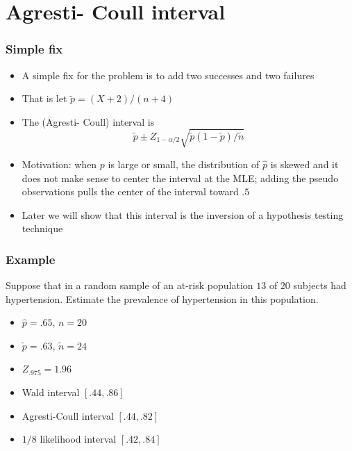 \documentclass[aspectratio=169]{beamer}
\begin{document}
\section{Agresti- Coull interval}
\begin{frame}\frametitle{Simple fix}
\begin{itemize}
\item A simple fix for the problem is to add two successes and two failures
\item That is let $\tilde p = (X + 2) / (n + 4)$
\item The (Agresti- Coull) interval is 
  $$
  \tilde p \pm Z_{1-\alpha/2} \sqrt{\tilde p (1 - \tilde p) / \tilde n}
  $$
\item Motivation: when $p$ is large or small, the distribution of
  $\hat p$ is skewed and it does not make sense to center the interval
  at the MLE; adding the pseudo observations pulls the center of
  the interval toward $.5$
\item Later we will show that this interval is the inversion of a
  hypothesis testing technique
\end{itemize}
\end{frame}

\begin{frame}\frametitle{Example}
Suppose that in a random sample of an at-risk population
$13$ of $20$ subjects had hypertension. Estimate the prevalence
of hypertension in this population.
\begin{itemize}
\item $\hat p = .65$,  $n = 20$
\item $\tilde p = .63$, $\tilde n = 24$
\item $Z_{.975} = 1.96$
\item Wald interval $[.44, .86]$
\item Agresti-Coull interval $[.44, .82]$ 
\item $1/8$ likelihood interval $[.42, .84]$
\end{itemize}
\end{frame}
\end{document}
